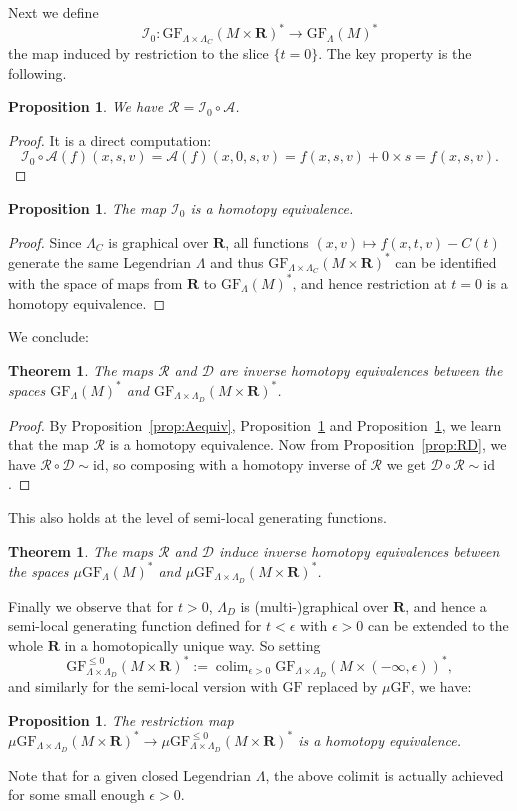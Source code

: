 \documentclass[12pt,a4paper]{article}
\numberwithin{equation}{section}
\newtheorem{thm}[equation]{Theorem}
\newtheorem{prop}[equation]{Proposition}
\newtheorem{proposition}[equation]{Proposition}
\theoremstyle{definition}
\theoremstyle{remark}
\newcommand{\A}{\mathcal{A}}
\newcommand{\R}{\mathbf{R}}
\newcommand{\DD}{\mathcal{D}}
\newcommand{\RR}{\mathcal{R}}
\newcommand{\id}{\mathrm{id}}
\newcommand{\II}{\mathcal{I}}
\DeclareMathOperator{\colim}{colim}
\newcommand{\GF}{\mathrm{GF}}
\begin{document}
Next we define
\[\II_0:\GF_{\Lambda\times \Lambda_C}(M\times \R)^*\to \GF_\Lambda(M)^*\]
the map induced by restriction to the slice $\{t=0\}$.
The key property is the following.

\begin{proposition}\label{prop:R=I0A}
We have $\RR=\II_0\circ \A$.
\end{proposition}
\begin{proof}
It is a direct computation:
\[\II_0\circ \A(f)(x,s,v)=\A(f)(x,0,s,v)=f(x,s,v)+0\times s= f(x,s,v).\]
\end{proof}

\begin{proposition}\label{prop:I0}
The map $\II_0$ is a homotopy equivalence.
\end{proposition}
\begin{proof}
Since $\Lambda_C$ is graphical over $\R$, all functions $(x,v)\mapsto f(x,t,v)-C(t)$ generate the same Legendrian $\Lambda$
and thus $\GF_{\Lambda\times \Lambda_C}(M\times \R)^*$ can be identified with the space of maps from $\R$ to $\GF_\Lambda(M)^*$, and hence
 restriction at $t=0$ is a homotopy equivalence.
\end{proof}
We conclude:

\begin{thm}\label{thm:GF_RD}
The maps $\RR$ and $\DD$ are inverse homotopy equivalences between the spaces $\GF_\Lambda(M)^*$ and $\GF_{\Lambda\times \Lambda_D}(M\times \R)^*$.
\end{thm}
\begin{proof}
By Proposition~\ref{prop:Aequiv}, Proposition~\ref{prop:I0} and Proposition~\ref{prop:R=I0A}, we learn that the map $\RR$ is
a homotopy equivalence. Now from Proposition~\ref{prop:RD}, we have $\RR\circ \DD \sim \id$, so composing with a homotopy inverse of $\RR$
we get $\DD\circ \RR \sim \id$.
\end{proof}

This also holds at the level of semi-local generating functions.
\begin{thm}\label{thm:muGF_RD}
The maps $\RR$ and $\DD$ induce inverse homotopy equivalences between the spaces $\mu\GF_\Lambda(M)^*$ and $\mu\GF_{\Lambda\times \Lambda_D}(M\times \R)^*$.
\end{thm}

Finally we observe that for $t>0$, $\Lambda_D$ is (multi-)graphical over $\R$, and hence a semi-local generating function defined
for $t<\epsilon$ with $\epsilon >0$ can be extended to the whole $\R$ in a homotopically unique way. So setting
\[\GF^{\leq 0}_{\Lambda\times \Lambda_D}(M\times \R)^*:=\colim_{\epsilon >0} \GF_{\Lambda\times \Lambda_D}(M\times (-\infty,\epsilon))^*,\]
and similarly for the semi-local version with $\GF$ replaced by $\mu \GF$,
we have:
\begin{prop}\label{prop:muleq0}
The restriction map $\mu\GF_{\Lambda\times \Lambda_D}(M\times \R)^* \to \mu\GF^{\leq 0}_{\Lambda\times \Lambda_D}(M\times \R)^*$ is a homotopy equivalence.
\end{prop}
Note that for a given closed Legendrian $\Lambda$, the above colimit is actually achieved for some small enough $\epsilon>0$.
\end{document}
